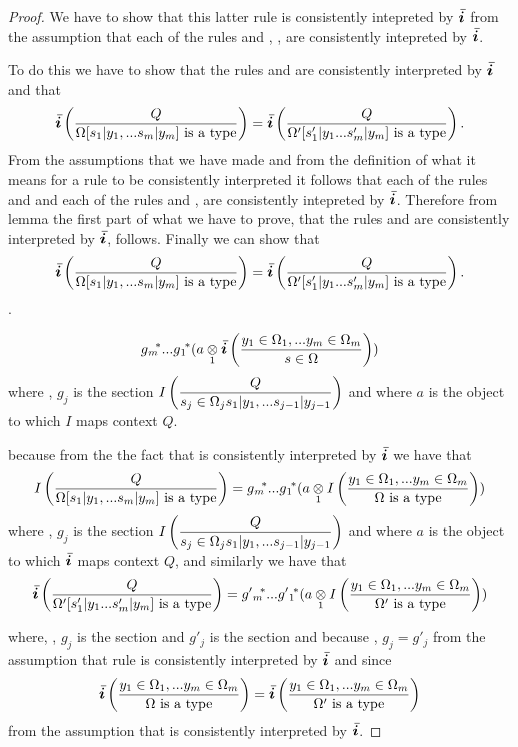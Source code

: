 \begin{proof}
We have to show that this latter rule is consistently intepreted by $\Ibar$  from the assumption that each of the rules  and
, \foreachj, are consistently intepreted by $\Ibar$.

To do this we have to show that the rules \ZOmegaSUBsmFORym and 
are consistently interpreted by $\Ibar$ and that
$$
\ibarmappedrule{Q}{\isT{\Omega[\SUBsFORy{m}]}} = \ibarmappedrule{Q}{\isT{\Omega'[s'_1|y_1...s'_m|y_m]}}.
$$
From the assumptions that we have made and from the definition of what it means for a rule to be consistently interpreted it follows that
each of the rules
\ZOmega
and
and each of the rules
and
\foreachj, are consistently intepreted by $\Ibar$. Therefore from lemma  
the first part of what we have to prove, that the rules \ZOmegaSUBsmFORym and 
are consistently interpreted by $\Ibar$, follows.
Finally we can show that
$$
\ibarmappedrule{Q}{\isT{\Omega[\SUBsFORy{m}]}} = \ibarmappedrule{Q}{\isT{\Omega'[s'_1|y_1...s'_m|y_m]}}.
$$.

\begin{newtt}
$$ \gmstar...\gonestar(\crossx{a}{\ibarmappedrule{\yOmega{m}}{\ofT{s}{\Omega}}}{1})$$
where \foreachj, $g_j$ is the section
$\displaystyle\Imappedrule{Q}{ \ofT{s_j}{\Omega_j \SUBsFORy{j-1}}}$
and where $a$ is the object to which $I$ maps context $Q$.

\end{newtt}

because  from the the fact  that \ZOmegaSUBsmFORym is consistently interpreted by $\Ibar$ we have that
$$
\Imappedrule{Q}{\isT{\Omega[\SUBsFORy{m}]}} = \gmstar...\gonestar(\crossx{a}{\Imappedrule{\yOmega{m}}{\isT{\Omega}}}{1})
$$
where \foreachj, $g_j$ is the section
$\displaystyle\Imappedrule{Q}{ \ofT{s_j}{\Omega_j \SUBsFORy{j-1}}}$
and where $a$ is the object to which $\Ibar$ maps context $Q$,
and similarly we have that
$$
\ibarmappedrule{Q}{\isT{\Omega'[s'_1|y_1...s'_m|y_m]}} = \gprimemstar...\gprimeonestar(\crossx{a}{\Imappedrule{\yOmega{m}}{\isT{\Omega'}}}{1})
$$

where, \foreachj,  
$g_j$ is the section 
and $g'_j$ is the section 
and because \foreachj, $g_j=g'_j$ from the assumption
that rule  is consistently interpreted by $\Ibar$
and since
$$
\ibarmappedrule{\yOmega{m}}{\isT{\Omega}} = \ibarmappedrule{\yOmega{m}}{\isT{\Omega'}}
$$
from the assumption that  is consistently interpreted by $\Ibar$.



\end{proof}
